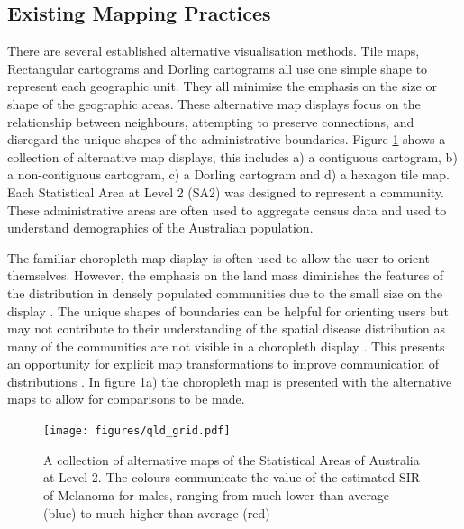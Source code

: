 \hypertarget{existing-mapping-practices}{%
\subsection{Existing Mapping
Practices}\label{existing-mapping-practices}}

There are several established alternative visualisation methods. Tile
maps, Rectangular cartograms \citep{ORC} and Dorling cartograms
\citep{ACTUC} all use one simple shape to represent each geographic
unit. They all minimise the emphasis on the size or shape of the
geographic areas. These alternative map displays focus on the
relationship between neighbours, attempting to preserve connections, and
disregard the unique shapes of the administrative boundaries. Figure
\ref{fig:qld_grid} shows a collection of alternative map displays, this
includes a) a contiguous cartogram, b) a non-contiguous cartogram, c) a
Dorling cartogram and d) a hexagon tile map. Each Statistical Area at
Level 2 (SA2) \citep{abs2011} was designed to represent a community.
These administrative areas are often used to aggregate census data and
used to understand demographics of the Australian population.

The familiar choropleth map display is often used to allow the user to
orient themselves. However, the emphasis on the land mass diminishes the
features of the distribution in densely populated communities due to the
small size on the display \citep{ACTUC}. The unique shapes of boundaries
can be helpful for orienting users but may not contribute to their
understanding of the spatial disease distribution as many of the
communities are not visible in a choropleth display \citep{TVSSS}. This
presents an opportunity for explicit map transformations to improve
communication of distributions \citep{CBATCC}. In figure
\ref{fig:qld_grid}a) the choropleth map is presented with the
alternative maps to allow for comparisons to be made.

\begin{figure}[h]
\centering
\texttt{[image: figures/qld\_grid.pdf]}
\caption{\label{fig:qld_grid}A collection of alternative maps of the Statistical Areas of Australia at Level 2. The colours communicate the value of the estimated SIR of Melanoma for males, ranging from much lower than average (blue) to much higher than average (red)}
\end{figure}

